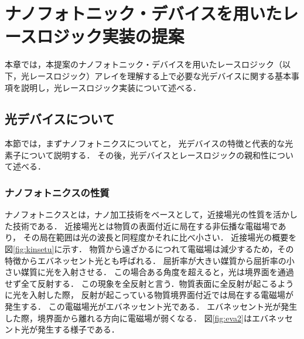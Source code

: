 \chapter{ナノフォトニック・デバイスを用いたレースロジック実装の提案}
本章では，本提案のナノフォトニック・デバイスを用いたレースロジック（以下，光レースロジック）アレイを理解する上で必要な光デバイスに関する基本事項を説明し，光レースロジック実装について述べる．

\section{光デバイスについて}
本節では，まずナノフォトニクスについてと，
光デバイスの特徴と代表的な光素子について説明する．
その後，光デバイスとレースロジックの親和性について述べる．

\subsection{ナノフォトニクスの性質}
ナノフォトニクスとは，ナノ加工技術をベースとして，近接場光の性質を活かした技術である．
近接場光とは物質の表面付近に局在する非伝播な電磁場であり，
その局在範囲は光の波長と同程度かそれに比べ小さい．
近接場光の概要を図\ref{fig:kinsetu}に示す．
物質から遠ざかるにつれて電磁場は減少するため，その特徴からエバネッセント光とも呼ばれる．
屈折率が大きい媒質から屈折率の小さい媒質に光を入射させる．
この場合ある角度を超えると，光は境界面を通過せず全て反射する．
この現象を全反射と言う．物質表面に全反射が起こるように光を入射した際，
反射が起こっている物質境界面付近では局在する電磁場が発生する．
この電磁場光がエバネッセント光である．
エバネッセント光が発生した際，境界面から離れる方向に電磁場が弱くなる．
図\ref{fig:eva2}はエバネッセント光が発生する様子である．
